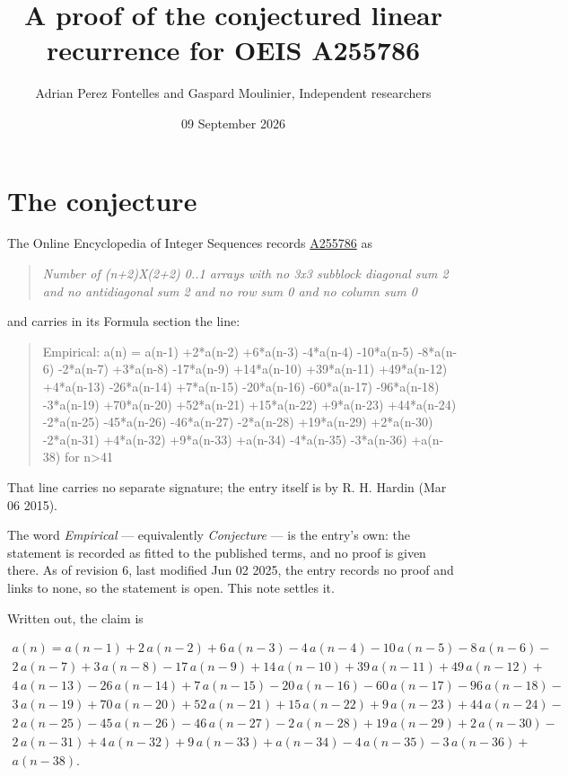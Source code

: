 \documentclass[11pt]{article}
\title{A proof of the conjectured linear recurrence for OEIS A255786}
\author{Adrian Perez Fontelles and Gaspard Moulinier, Independent researchers}
\date{09 September 2026}
\theoremstyle{definition}
\begin{document}
\maketitle
\section{The conjecture}

The Online Encyclopedia of Integer Sequences records \href{https://oeis.org/A255786}{A255786} as

\begin{quote}\itshape Number of (n+2)X(2+2) 0..1 arrays with no 3x3 subblock diagonal sum 2 and no antidiagonal sum 2 and no row sum 0 and no column sum 0\end{quote}

and carries in its Formula section the line:

\begin{quote}\ttfamily Empirical: a(n) = a(n-1) +2*a(n-2) +6*a(n-3) -4*a(n-4) -10*a(n-5) -8*a(n-6) -2*a(n-7) +3*a(n-8) -17*a(n-9) +14*a(n-10) +39*a(n-11) +49*a(n-12) +4*a(n-13) -26*a(n-14) +7*a(n-15) -20*a(n-16) -60*a(n-17) -96*a(n-18) -3*a(n-19) +70*a(n-20) +52*a(n-21) +15*a(n-22) +9*a(n-23) +44*a(n-24) -2*a(n-25) -45*a(n-26) -46*a(n-27) -2*a(n-28) +19*a(n-29) +2*a(n-30) -2*a(n-31) +4*a(n-32) +9*a(n-33) +a(n-34) -4*a(n-35) -3*a(n-36) +a(n-38) for n>41\end{quote}

That line carries no separate signature; the entry itself is by R. H. Hardin (Mar 06 2015).

The word {\itshape Empirical} --- equivalently {\itshape Conjecture} --- is the entry's own: the statement is recorded as fitted to the published terms, and no proof is given there. As of revision 6, last modified Jun 02 2025, the entry records no proof and links to none, so the statement is open. This note settles it.

Written out, the claim is

\begin{multline*} a(n) = a(n-1) + 2\,a(n-2) + 6\,a(n-3) - 4\,a(n-4) - 10\,a(n-5) - 8\,a(n-6) - \\ 2\,a(n-7) + 3\,a(n-8) - 17\,a(n-9) + 14\,a(n-10) + 39\,a(n-11) + 49\,a(n-12) + \\ 4\,a(n-13) - 26\,a(n-14) + 7\,a(n-15) - 20\,a(n-16) - 60\,a(n-17) - 96\,a(n-18) - \\ 3\,a(n-19) + 70\,a(n-20) + 52\,a(n-21) + 15\,a(n-22) + 9\,a(n-23) + 44\,a(n-24) - \\ 2\,a(n-25) - 45\,a(n-26) - 46\,a(n-27) - 2\,a(n-28) + 19\,a(n-29) + 2\,a(n-30) - \\ 2\,a(n-31) + 4\,a(n-32) + 9\,a(n-33) + a(n-34) - 4\,a(n-35) - 3\,a(n-36) + \\ a(n-38). \end{multline*}
\end{document}
